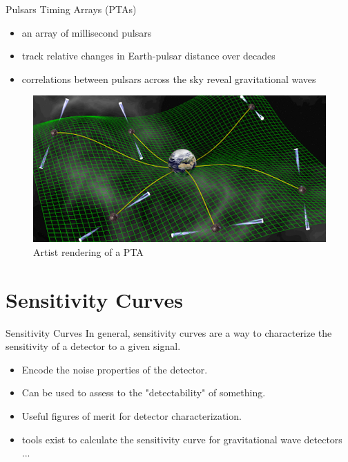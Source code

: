 \documentclass{beamer}
\begin{document}
\begin{frame}{Pulsars Timing Arrays (PTAs)}
\begin{itemize}
        \item an array of millisecond pulsars
        \item track relative changes in Earth-pulsar distance over decades
        \item correlations between pulsars across the sky reveal gravitational waves
    \end{itemize}
    \begin{figure}
        \centering
        \includegraphics[width=0.75\linewidth]{figs/champion_pta.png}
        \caption{Artist rendering of a PTA}
        \label{fig:pulsar}
    \end{figure}
\end{frame}


\section{Sensitivity Curves}
\begin{frame}{Sensitivity Curves}
    In general, sensitivity curves are a way to characterize the sensitivity of a detector to a given signal.
    \begin{itemize}
        \item Encode the noise properties of the detector.
        \item Can be used to assess to the "detectability" of something.
        \item Useful figures of merit for detector characterization.
        \item tools exist to calculate the sensitivity curve for gravitational wave detectors ...
    \end{itemize}
\end{frame}
\end{document}
